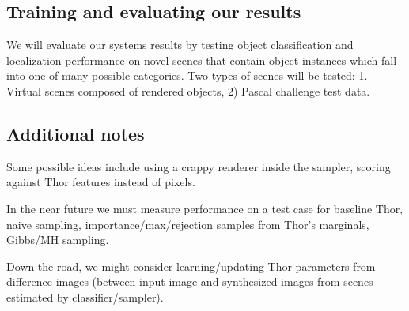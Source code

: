 \documentclass[]{report}
\begin{document}
\subsection*{Training and evaluating our results}
We will evaluate our systems results by testing object classification
and localization performance on novel scenes that contain object
instances which fall into one of many possible categories. Two types
of scenes will be tested: 1. Virtual scenes composed of rendered
objects, 2) Pascal challenge test data.

\subsection*{Additional notes}
Some possible ideas include using a crappy renderer inside the
sampler, scoring against Thor features instead of pixels.

In the near future we must measure performance on a test case for
baseline Thor, naive sampling, importance/max/rejection samples from
Thor's marginals, Gibbs/MH sampling. 

Down the road, we might consider learning/updating Thor parameters
from difference images (between input image and synthesized images
from scenes estimated by classifier/sampler).
\end{document}
